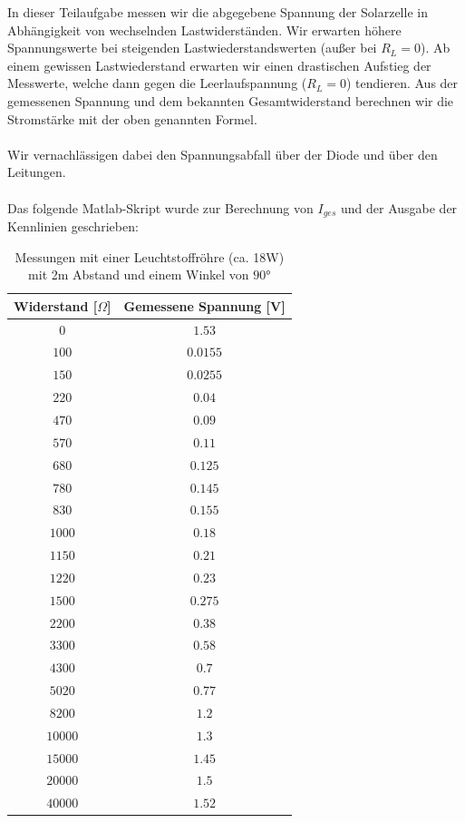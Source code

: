 
In dieser Teilaufgabe messen wir die abgegebene Spannung der Solarzelle in Abhängigkeit von wechselnden Lastwiderständen.
Wir erwarten höhere Spannungswerte bei steigenden Lastwiederstandswerten (außer bei $R_{L} = 0$).
Ab einem gewissen Lastwiederstand erwarten wir einen drastischen Aufstieg der Messwerte, welche dann gegen die Leerlaufspannung ($R_{L} = 0$) tendieren.
Aus der gemessenen Spannung und dem bekannten Gesamtwiderstand berechnen wir die Stromstärke mit der oben genannten Formel.
\\
\\
Wir vernachlässigen dabei den Spannungsabfall über der Diode und über den Leitungen.
\\
\\
Das folgende Matlab-Skript wurde zur Berechnung von $I_{ges}$ und der Ausgabe der Kennlinien geschrieben:


\clearpage
{}

\begin{table}[htb]
\centering
\caption{Messungen mit einer Leuchtstoffröhre (ca. 18W) mit 2m Abstand und einem Winkel von $\ang{90}$}
\label{Leuchtstoffröhre}
\begin{tabular}{cc}
\toprule
Widerstand [$\Omega$] & Gemessene Spannung [V]\\
\midrule
$0$ & $1.53$\\
$100$ & $0.0155$\\
$150$ & $0.0255$\\
$220$ & $0.04$\\
$470$ & $0.09$\\
$570$ & $0.11$\\
$680$ & $0.125$\\
$780$ & $0.145$\\
$830$ & $0.155$\\
$1000$ & $0.18$\\
$1150$ & $0.21$\\
$1220$ & $0.23$\\
$1500$ & $0.275$\\
$2200$ & $0.38$\\
$3300$ & $0.58$\\
$4300$ & $0.7$\\
$5020$ & $0.77$\\
$8200$ & $1.2$\\
$10000$ & $1.3$\\
$15000$ & $1.45$\\
$20000$ & $1.5$\\
$40000$ & $1.52$\\
\bottomrule
\end{tabular}
\end{table}

